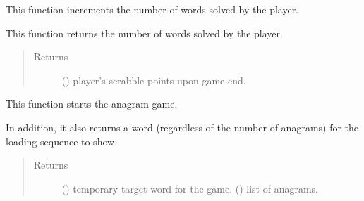 \documentclass[letterpaper,10pt,english,openany,oneside]{sphinxmanual}
\begin{document}
\begin{fulllineitems}
\label{\detokenize{index:engine.anagram_correct}}
This function increments the number of words solved by the player.

\end{fulllineitems}


\begin{fulllineitems}
\label{\detokenize{index:engine.anagram_end}}
This function returns the number of words solved by the player.
\begin{quote}\begin{description}
\item[{Returns}] \leavevmode
() player’s scrabble points upon game end.

\end{description}\end{quote}

\end{fulllineitems}


\begin{fulllineitems}
\label{\detokenize{index:engine.anagram_init}}
This function starts the anagram game.

In addition, it also returns a word (regardless of the number of anagrams)
for the loading sequence to show.
\begin{quote}\begin{description}
\item[{Returns}] \leavevmode
() temporary target word for the game, () list of anagrams.

\end{description}\end{quote}

\end{fulllineitems}

\end{document}
